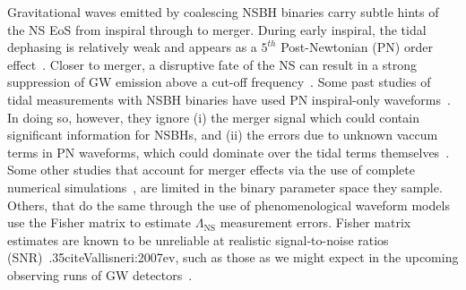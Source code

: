 \documentclass[aps,prd,amsmath,floats,floatfix, twocolumn,
superscriptaddress,nofootinbib,showpacs]{revtex4-1}
\newcommand{\lambdans}{\Lambda_\mathrm{NS}}
\begin{document}
Gravitational waves emitted by coalescing NSBH binaries carry subtle hints of
the NS EoS from inspiral through to merger. During early inspiral, the tidal
dephasing is relatively weak and appears as a $5^{th}$ Post-Newtonian (PN)
order effect~\cite{Vines2011}. Closer to merger, a disruptive fate of the NS
can result in a strong suppression of GW emission above a cut-off 
frequency~\cite{Pannarale:2015jia}. Some past studies of tidal measurements
with NSBH binaries have used PN inspiral-only waveforms~\cite{Maselli:2013rza}.
In doing so, however, they ignore (i) the merger signal which could contain significant
information for NSBHs, and (ii) the errors due to unknown vaccum terms in PN 
waveforms, which could dominate over the tidal terms themselves~\cite{Barkett2015,
Yagi:2014}.
% 
Some other studies that account for merger effects via the use of complete
numerical simulations~\cite{Foucart:2013psa}, are limited in the binary
parameter space they sample.
% 
Others, that do the same through the use of phenomenological waveform
models~\cite{Lackey2011,Lackey:2013axa} use the Fisher matrix to estimate
$\lambdans$ measurement errors. Fisher matrix estimates are known to be
unreliable at realistic signal-to-noise ratios (SNR)~\1.35cite{Vallisneri:2007ev},
such as those as we might expect in the upcoming observing runs of GW
detectors~\cite{Abadie:2010cf}.




\end{document}
